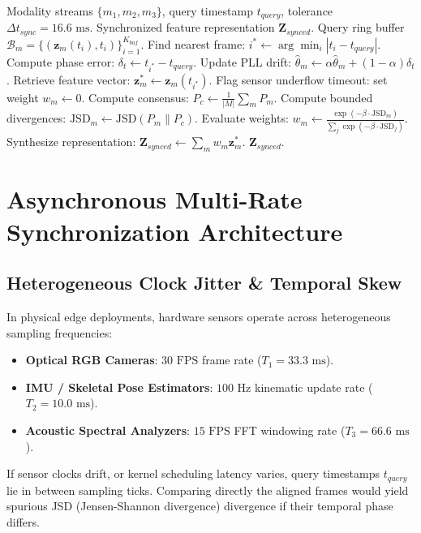 \documentclass[conference]{IEEEtran}
\begin{document}
\begin{algorithm}[t]
\caption{Asynchronous Multi-Rate Synchronization}
\label{alg:multirate_sync}
\begin{algorithmic}[1]
\REQUIRE Modality streams $\{m_1, m_2, m_3\}$, query timestamp $t_{query}$, tolerance $\Delta t_{sync} = 16.6\text{ ms}$.
\ENSURE Synchronized feature representation $\mathbf{Z}_{synced}$.
    \STATE Query ring buffer $\mathcal{B}_m = \{(\mathbf{z}_m(t_i), t_i)\}_{i=1}^{K_{buf}}$.
    \STATE Find nearest frame: $i^* \leftarrow \arg\min_i |t_i - t_{query}|$.
        \STATE Compute phase error: $\delta_t \leftarrow t_{i^*} - t_{query}$.
        \STATE Update PLL drift: $\hat{\theta}_m \leftarrow \alpha \hat{\theta}_m + (1-\alpha) \delta_t$.
        \STATE Retrieve feature vector: $\mathbf{z}_m^* \leftarrow \mathbf{z}_m(t_{i^*})$.
    \ELSE
        \STATE Flag sensor underflow timeout: set weight $w_m \leftarrow 0$.
    \ENDIF
\ENDFOR
\STATE Compute consensus: $P_c \leftarrow \frac{1}{|M|}\sum_m P_m$.
\STATE Compute bounded divergences: $\mathrm{JSD}_m \leftarrow \mathrm{JSD}(P_m \parallel P_c)$.
\STATE Evaluate weights: $w_m \leftarrow \frac{\exp(-\beta \cdot \mathrm{JSD}_m)}{\sum_j \exp(-\beta \cdot \mathrm{JSD}_j)}$.
\STATE Synthesize representation: $\mathbf{Z}_{synced} \leftarrow \sum_m w_m \mathbf{z}_m^*$.
\RETURN $\mathbf{Z}_{synced}$.
\end{algorithmic}
\end{algorithm}

\section{Asynchronous Multi-Rate Synchronization Architecture}
\subsection{Heterogeneous Clock Jitter \& Temporal Skew}
In physical edge deployments, hardware sensors operate across heterogeneous sampling frequencies:
\begin{itemize}
    \item \textbf{Optical RGB Cameras}: $30\text{ FPS}$ frame rate ($T_1 = 33.3\text{ ms}$).
    \item \textbf{IMU / Skeletal Pose Estimators}: $100\text{ Hz}$ kinematic update rate ($T_2 = 10.0\text{ ms}$).
    \item \textbf{Acoustic Spectral Analyzers}: $15\text{ FPS}$ FFT windowing rate ($T_3 = 66.6\text{ ms}$).
\end{itemize}
If sensor clocks drift, or kernel scheduling latency varies, query timestamps $t_{query}$ lie in between sampling ticks. Comparing directly the aligned frames would yield spurious JSD (Jensen-Shannon divergence) divergence if their temporal phase differs.
\end{document}
